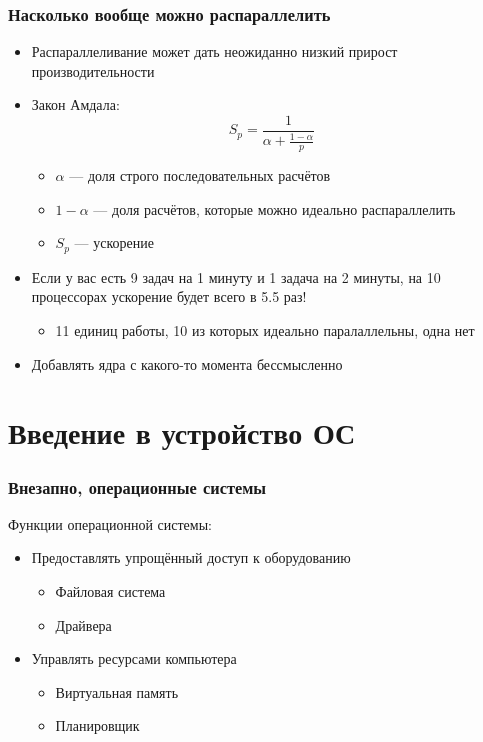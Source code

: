 \documentclass[xetex,mathserif,serif]{beamer}
\begin{document}
    \begin{frame}
        \frametitle{Насколько вообще можно распараллелить}
        \begin{itemize}
            \item Распараллеливание может дать неожиданно низкий прирост производительности
            \item Закон Амдала:
                $$S_p = \frac{1}{\alpha + \frac{1 - \alpha}{p}}$$
            \begin{itemize}
                \item $\alpha$ --- доля строго последовательных расчётов
                \item $1 - \alpha$ --- доля расчётов, которые можно идеально распараллелить
                \item $S_p$ --- ускорение
            \end{itemize}
            \item Если у вас есть 9 задач на 1 минуту и 1 задача на 2 минуты, на 10 процессорах ускорение будет всего в 5.5 раз!
            \begin{itemize}
                \item 11 единиц работы, 10 из которых идеально паралаллельны, одна нет
            \end{itemize}
            \item Добавлять ядра с какого-то момента бессмысленно
        \end{itemize}
    \end{frame}

    \section{Введение в устройство ОС}

    \begin{frame}
        \frametitle{Внезапно, операционные системы}
        Функции операционной системы:
        \begin{itemize}
            \item Предоставлять упрощённый доступ к оборудованию
            \begin{itemize}
                \item Файловая система
                \item Драйвера
            \end{itemize}
            \item Управлять ресурсами компьютера
            \begin{itemize}
                \item Виртуальная память
                \item Планировщик
            \end{itemize}
        \end{itemize}
    \end{frame}
\end{document}
